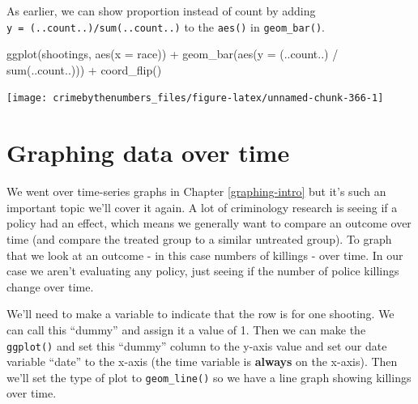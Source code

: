 \documentclass[
]{krantz}
\makeatletter
\newenvironment{Shaded}{\begin{snugshade}}{\end{snugshade}}
\newcommand{\AttributeTok}[1]{\textcolor[rgb]{0.61,0.61,0.61}{#1}}
\newcommand{\DecValTok}[1]{\textcolor[rgb]{0.06,0.06,0.06}{#1}}
\newcommand{\FunctionTok}[1]{\textcolor[rgb]{0,0,0}{#1}}
\newcommand{\NormalTok}[1]{#1}
\newcommand{\OtherTok}[1]{\textcolor[rgb]{0.37,0.37,0.37}{#1}}
\newcommand{\SpecialCharTok}[1]{\textcolor[rgb]{0,0,0}{#1}}
\newenvironment{kframe}{%
\medskip{}
\setlength{\fboxsep}{.8em}
 \def\at@end@of@kframe{}%
 \ifinner\ifhmode%
  \def\at@end@of@kframe{\end{minipage}}%
  \begin{minipage}{\columnwidth}%
 \fi\fi%
 \def\FrameCommand##1{\hskip\@totalleftmargin \hskip-\fboxsep
 \colorbox{shadecolor}{##1}\hskip-\fboxsep
     \hskip-\linewidth \hskip-\@totalleftmargin \hskip\columnwidth}%
 \MakeFramed {\advance\hsize-\width
   \@totalleftmargin\z@ \linewidth\hsize
   \@setminipage}}%
 {\par\unskip\endMakeFramed%
 \at@end@of@kframe}
\renewenvironment{Shaded}{\begin{kframe}}{\end{kframe}}
\makeatother
\begin{document}
As earlier, we can show proportion instead of count by
adding \texttt{y\ =\ (..count..)/sum(..count..)} to the
\texttt{aes()} in \texttt{geom\_bar()}.

\begin{Shaded}
\begin{Highlighting}[]
\FunctionTok{ggplot}\NormalTok{(shootings, }\FunctionTok{aes}\NormalTok{(}\AttributeTok{x =}\NormalTok{ race)) }\SpecialCharTok{+}
  \FunctionTok{geom\_bar}\NormalTok{(}\FunctionTok{aes}\NormalTok{(}\AttributeTok{y =}\NormalTok{ (..count..) }\SpecialCharTok{/} \FunctionTok{sum}\NormalTok{(..count..))) }\SpecialCharTok{+}
  \FunctionTok{coord\_flip}\NormalTok{()}
\end{Highlighting}
\end{Shaded}

\begin{center}\texttt{[image: crimebythenumbers\_files/figure-latex/unnamed-chunk-366-1]} \end{center}

\hypertarget{graphing-data-over-time}{%
\section{Graphing data over
time}\label{graphing-data-over-time}}

We went over time-series graphs in Chapter
\ref{graphing-intro} but it's such an important topic we'll
cover it again. A lot of criminology research is seeing if a
policy had an effect, which means we generally want to
compare an outcome over time (and compare the treated group
to a similar untreated group). To graph that we look at an
outcome - in this case numbers of killings - over time. In
our case we aren't evaluating any policy, just seeing if the
number of police killings change over time.

We'll need to make a variable to indicate that the row is
for one shooting. We can call this ``dummy'' and assign it a
value of 1. Then we can make the \texttt{ggplot()} and set
this ``dummy'' column to the y-axis value and set our date
variable ``date'' to the x-axis (the time variable is
\textbf{always} on the x-axis). Then we'll set the type of
plot to \texttt{geom\_line()} so we have a line graph
showing killings over time.

\begin{Shaded}
\end{Shaded}
\end{document}
